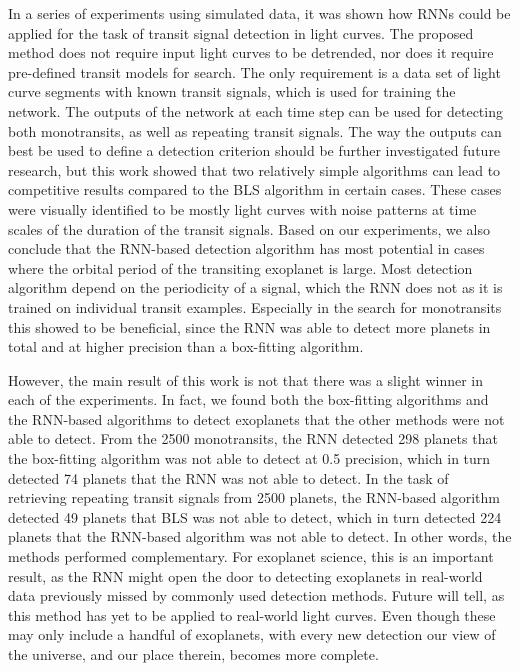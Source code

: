 
In a series of experiments using simulated data, it was shown how RNNs could be applied for the task of transit signal detection in light curves. The proposed method does not require input light curves to be detrended, nor does it require pre-defined transit models for search. The only requirement is a data set of light curve segments with known transit signals, which is used for training the network. The outputs of the network at each time step can be used for detecting both monotransits, as well as repeating transit signals. The way the outputs can best be used to define a detection criterion should be further investigated future research, but this work showed that two relatively simple algorithms can lead to competitive results compared to the BLS algorithm in certain cases. These cases were visually identified to be mostly light curves with noise patterns at time scales of the duration of the transit signals. Based on our experiments, we also conclude that the RNN-based detection algorithm has most potential in cases where the orbital period of the transiting exoplanet is large. Most detection algorithm depend on the periodicity of a signal, which the RNN does not as it is trained on individual transit examples. Especially in the search for monotransits this showed to be beneficial, since the RNN was able to detect more planets in total and at higher precision than a box-fitting algorithm. 

However, the main result of this work is not that there was a slight winner in each of the experiments. In fact, we found both the box-fitting algorithms and the RNN-based algorithms to detect exoplanets that the other methods were not able to detect. From the 2500 monotransits, the RNN detected 298 planets that the box-fitting algorithm was not able to detect at 0.5 precision, which in turn detected 74 planets that the RNN was not able to detect. In the task of retrieving repeating transit signals from 2500 planets, the RNN-based algorithm detected 49 planets that BLS was not able to detect, which in turn detected 224 planets that the RNN-based algorithm was not able to detect. In other words, the methods performed complementary. For exoplanet science, this is an important result, as the RNN might open the door to detecting exoplanets in real-world data previously missed by commonly used detection methods. Future will tell, as this method has yet to be applied to real-world light curves. Even though these may only include a handful of exoplanets, with every new detection our view of the universe, and our place therein, becomes more complete.